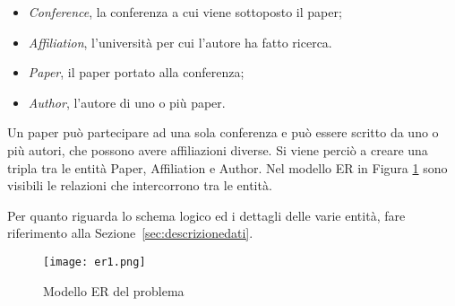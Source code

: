 \begin{itemize}
    \item \textit{Conference}, la conferenza a cui viene sottoposto il paper;
    \item \textit{Affiliation}, l'università per cui l'autore ha fatto ricerca. 
    \item \textit{Paper}, il paper portato alla conferenza;
    \item \textit{Author}, l'autore di uno o più paper. 
\end{itemize}

Un paper può partecipare ad una sola conferenza e può essere scritto da uno o
più autori, che possono avere affiliazioni diverse. Si viene perciò a
creare una tripla tra le entità Paper, Affiliation e Author.
Nel modello ER in Figura \ref{fig:er1} sono visibili le relazioni che
intercorrono tra le entità.

Per quanto riguarda lo schema logico ed i dettagli delle varie entità,
fare riferimento alla Sezione~\ref{sec:descrizionedati}.

\begin{figure}
    \centering
    \texttt{[image: er1.png]}
    \caption{Modello ER del problema}
    \label{fig:er1}
\end{figure}
